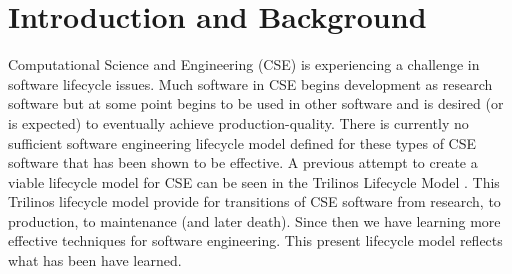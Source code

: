 \documentclass[11pt]{SANDreport}
\begin{document}
%
\SANDmain %




%
\section{Introduction and Background}
%


\begin{figure}
\begin{center}
\end{center}
\end{figure}


Computational Science and Engineering (CSE) is experiencing a
challenge in software lifecycle issues.  Much software in CSE begins
development as research software but at some point begins to be used
in other software and is desired (or is expected) to eventually
achieve production-quality.  There is currently no sufficient software
engineering lifecycle model defined for these types of CSE software
that has been shown to be effective.  A previous attempt to create a
viable lifecycle model for CSE can be seen in the Trilinos Lifecycle
Model {}\cite{TrilinosLifecycleModel2007}.  This Trilinos lifecycle
model provide for transitions of CSE software from research, to
production, to maintenance (and later death).  Since then we have
learning more effective techniques for software engineering.  This
present lifecycle model reflects what has been have learned.
\end{document}
